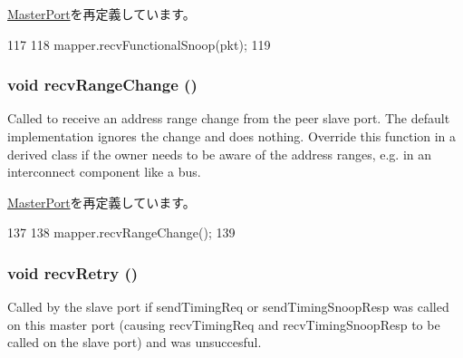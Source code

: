 \hyperlink{classMasterPort_af5b15bc08781cf0ba6190efc37d5b67e}{MasterPort}を再定義しています。


\begin{DoxyCode}
117         {
118             mapper.recvFunctionalSnoop(pkt);
119         }
\end{DoxyCode}
\hypertarget{classAddrMapper_1_1MapperMasterPort_aecf310a01b533ae8700eccac2cf20480}{
\subsubsection[{recvRangeChange}]{\setlength{\rightskip}{0pt plus 5cm}void recvRangeChange ()}}
\label{classAddrMapper_1_1MapperMasterPort_aecf310a01b533ae8700eccac2cf20480}
Called to receive an address range change from the peer slave port. The default implementation ignores the change and does nothing. Override this function in a derived class if the owner needs to be aware of the address ranges, e.g. in an interconnect component like a bus. 

\hyperlink{classMasterPort_af60d9c2c17fb4c9ebc5384a7e0c9f289}{MasterPort}を再定義しています。


\begin{DoxyCode}
137         {
138             mapper.recvRangeChange();
139         }
\end{DoxyCode}
\hypertarget{classAddrMapper_1_1MapperMasterPort_a29cb5a4f98063ce6e9210eacbdb35298}{
\subsubsection[{recvRetry}]{\setlength{\rightskip}{0pt plus 5cm}void recvRetry ()}}
\label{classAddrMapper_1_1MapperMasterPort_a29cb5a4f98063ce6e9210eacbdb35298}
Called by the slave port if sendTimingReq or sendTimingSnoopResp was called on this master port (causing recvTimingReq and recvTimingSnoopResp to be called on the slave port) and was unsuccesful. 

